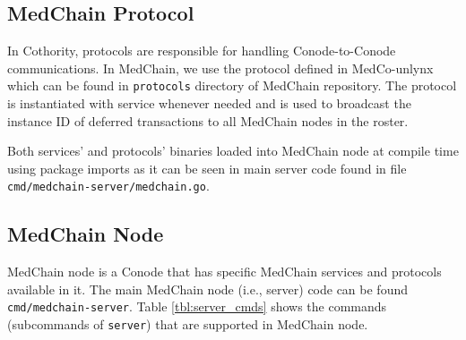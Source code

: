 \subsection{MedChain Protocol}
In Cothority, protocols are responsible for handling Conode-to-Conode communications. In MedChain, we use the protocol defined in MedCo-unlynx which can be found in \texttt{protocols} directory of MedChain repository. The protocol is instantiated with service whenever needed and is used to broadcast the instance ID of deferred transactions to all MedChain nodes in the roster. 

Both services' and protocols' binaries loaded into MedChain node at compile time using package imports as it can be seen in main server code found in file  \texttt{cmd/medchain-server/medchain.go}. 


\subsection{MedChain Node}
MedChain node is a Conode that has specific MedChain services and protocols available in it. The main MedChain node (i.e., server) code can be found \texttt{cmd/medchain-server}. Table \ref{tbl:server_cmds} shows the commands (subcommands of \texttt{server}) that are supported in MedChain node.  

